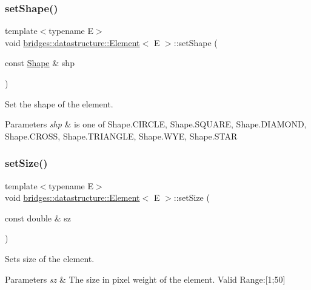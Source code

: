 \subsubsection{\texorpdfstring{set\+Shape()}{setShape()}}
{\footnotesize\ttfamily template$<$typename E$>$ \\
void \hyperlink{classbridges_1_1datastructure_1_1_element}{bridges\+::datastructure\+::\+Element}$<$ E $>$\+::set\+Shape (\begin{DoxyParamCaption}\item[{const \hyperlink{namespacebridges_1_1datastructure_a3408f5f44d9c6062e5f3adb7e1bbb7f0}{Shape} \&}]{shp }\end{DoxyParamCaption})\hspace{0.3cm}{\ttfamily [inline]}}



Set the shape of the element. 


\begin{DoxyParams}{Parameters}
{\em shp} & is one of Shape.\+C\+I\+R\+C\+LE, Shape.\+S\+Q\+U\+A\+RE, Shape.\+D\+I\+A\+M\+O\+ND, Shape.\+C\+R\+O\+SS, Shape.\+T\+R\+I\+A\+N\+G\+LE, Shape.\+W\+YE, Shape.\+S\+T\+AR \\
\hline
\end{DoxyParams}
\mbox{\label{classbridges_1_1datastructure_1_1_element_a3200b0ac712c1720db62d1f0bbcb14be}} 
\subsubsection{\texorpdfstring{set\+Size()}{setSize()}}
{\footnotesize\ttfamily template$<$typename E$>$ \\
void \hyperlink{classbridges_1_1datastructure_1_1_element}{bridges\+::datastructure\+::\+Element}$<$ E $>$\+::set\+Size (\begin{DoxyParamCaption}\item[{const double \&}]{sz }\end{DoxyParamCaption})\hspace{0.3cm}{\ttfamily [inline]}}



Sets size of the element. 


\begin{DoxyParams}{Parameters}
{\em sz} & The size in pixel weight of the element. Valid Range\+:\mbox{[}1;50\mbox{]} \\
\hline
\end{DoxyParams}
\mbox{\label{classbridges_1_1datastructure_1_1_element_a26f2aceb9eed7195fd55b3538f3c059f}} 
